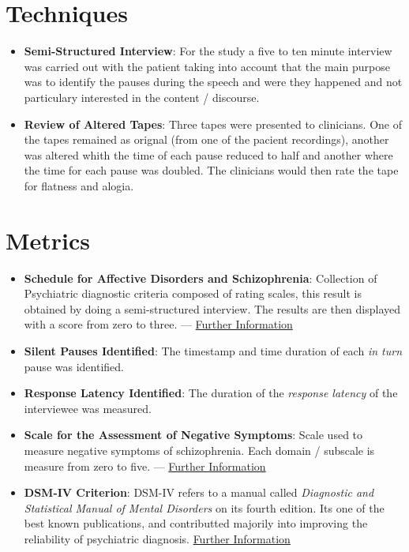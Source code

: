 \documentclass{Paper_Summary}
\begin{document}
\section{Techniques}
    \begin{itemize}
        \item \textbf{Semi-Structured Interview}: For the study a five to ten minute interview was carried out with the patient taking into account that the main purpose was to identify the pauses during the speech and were they happened and not particulary interested in the content / discourse.
        \item \textbf{Review of Altered Tapes}: Three tapes were presented to clinicians. One of the tapes remained as orignal (from one of the pacient recordings), another was altered whith the time of each pause reduced to half and another where the time for each pause was doubled. The clinicians would then rate the tape for flatness and alogia.
    \end{itemize}

\section{Metrics}
    \begin{itemize}
        \item \textbf{Schedule for Affective Disorders and Schizophrenia}: Collection of Psychiatric diagnostic criteria composed of rating scales, this result is obtained by doing a semi-structured interview. The results are then displayed with a score from zero to three. — \href{https://en.wikipedia.org/wiki/Schedule_for_Affective_Disorders_and_Schizophrenia}{Further Information}
        \item \textbf{Silent Pauses Identified}: The timestamp and time duration of each \emph{in turn} pause was identified.
        \item \textbf{Response Latency Identified}: The duration of the \emph{response latency} of the interviewee was measured.
        \item \textbf{Scale for the Assessment of Negative Symptoms}: Scale used to measure negative symptoms of schizophrenia. Each domain / subscale is measure from zero to five. — \href{https://en.wikipedia.org/wiki/Scale_for_the_Assessment_of_Negative_Symptoms}{Further Information}
        \item \textbf{DSM-IV Criterion}: DSM-IV refers to a manual called \emph{Diagnostic and Statistical Manual of Mental Disorders} on its fourth edition. Its one of the best known publications, and contributted majorily into improving the reliability of psychiatric diagnosis. \href{https://en.wikipedia.org/wiki/Diagnostic_and_Statistical_Manual_of_Mental_Disorders#DSM-IV_(1994)}{Further Information}
    \end{itemize}
\end{document}
